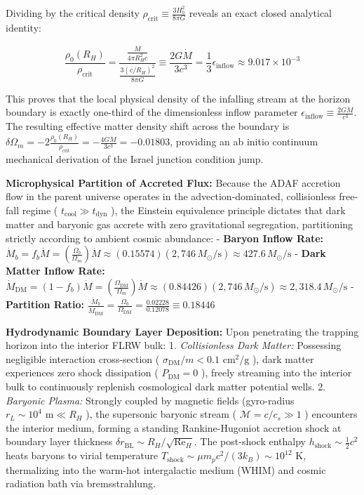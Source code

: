 \documentclass[11pt,a4paper]{article}
\theoremstyle{definition}\newtheorem{definition}{Definition}
\theoremstyle{remark}\newtheorem{remark}{Remark}
\begin{document}
Dividing by the critical density $\rho_{\text{crit}} \equiv \frac{3 H_0^2}{8\pi G}$ reveals an exact closed analytical identity:


\begin{equation}
\frac{\rho_0(R_H)}{\rho_{\text{crit}}} = \frac{\frac{\dot{M}}{4\pi R_H^2 c}}{\frac{3 (c/R_H)^2}{8\pi G}} \equiv \frac{2 G \dot{M}}{3 c^3} = \frac{1}{3} \epsilon_{\text{inflow}} \approx 9.017 \times 10^{-3}
\end{equation}


This proves that the local physical density of the infalling stream at the horizon boundary is exactly one-third of the dimensionless inflow parameter $\epsilon_{\text{inflow}} \equiv \frac{2 G \dot{M}}{c^3}$. The resulting effective matter density shift across the boundary is $\delta\Omega_m = -2 \frac{\rho_0(R_H)}{\rho_{\text{crit}}} = -\frac{4 G \dot{M}}{3 c^3} = -0.01803$, providing an ab initio continuum mechanical derivation of the Israel junction condition jump.

\textbf{Microphysical Partition of Accreted Flux:}
Because the ADAF accretion flow in the parent universe operates in the advection-dominated, collisionless free-fall regime ( $t_{\text{cool}} \gg t_{\text{dyn}}$ ), the Einstein equivalence principle dictates that dark matter and baryonic gas accrete with zero gravitational segregation, partitioning strictly according to ambient cosmic abundance:
- \textbf{Baryon Inflow Rate:} $\dot{M}_b = f_b \dot{M} = \left(\frac{\Omega_b}{\Omega_m}\right) \dot{M} \approx (0.15574)(2{,}746\,M_\odot/\text{s}) \approx 427.6\,M_\odot/\text{s}$
- \textbf{Dark Matter Inflow Rate:} $\dot{M}_{\text{DM}} = (1 - f_b) \dot{M} = \left(\frac{\Omega_{\text{DM}}}{\Omega_m}\right) \dot{M} \approx (0.84426)(2{,}746\,M_\odot/\text{s}) \approx 2{,}318.4\,M_\odot/\text{s}$
- \textbf{Partition Ratio:} $\frac{\dot{M}_b}{\dot{M}_{\text{DM}}} = \frac{\Omega_b}{\Omega_{\text{DM}}} = \frac{0.02228}{0.12078} \equiv 0.18446$

\textbf{Hydrodynamic Boundary Layer Deposition:}
Upon penetrating the trapping horizon into the interior FLRW bulk:
1. \textit{Collisionless Dark Matter:} Possessing negligible interaction cross-section ( $\sigma_{\text{DM}}/m < 0.1\text{ cm}^2/\text{g}$ ), dark matter experiences zero shock dissipation ( $P_{\text{DM}} = 0$ ), freely streaming into the interior bulk to continuously replenish cosmological dark matter potential wells.
2. \textit{Baryonic Plasma:} Strongly coupled by magnetic fields (gyro-radius $r_L \sim 10^4\text{ m} \ll R_H$ ), the supersonic baryonic stream ( $\mathcal{M} = c/c_s \gg 1$ ) encounters the interior medium, forming a standing Rankine-Hugoniot accretion shock at boundary layer thickness $\delta r_{\text{BL}} \sim R_H / \sqrt{\mathrm{Re}_H}$. The post-shock enthalpy $h_{\text{shock}} \sim \frac{1}{2} c^2$ heats baryons to virial temperature $T_{\text{shock}} \sim \mu m_p c^2 / (3 k_B) \sim 10^{12}\text{ K}$, thermalizing into the warm-hot intergalactic medium (WHIM) and cosmic radiation bath via bremsstrahlung.
\end{document}
